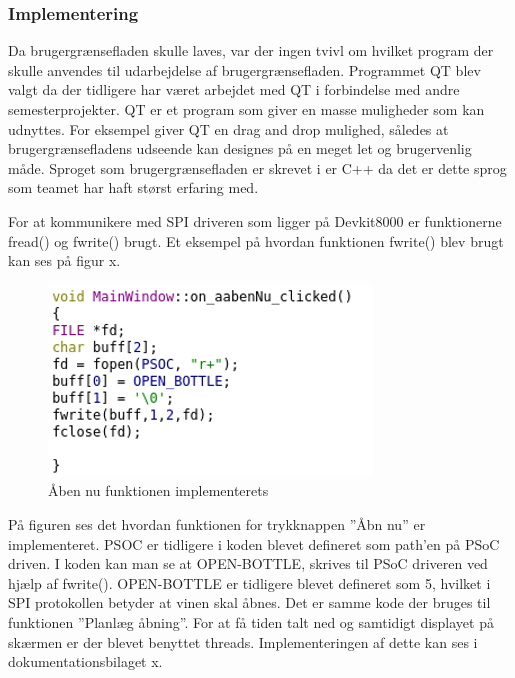 \subsubsection{Implementering}

Da brugergrænsefladen skulle laves, var der ingen tvivl om hvilket program der skulle anvendes til udarbejdelse af brugergrænsefladen. Programmet QT blev valgt da der tidligere har været arbejdet med QT i forbindelse med andre semesterprojekter. QT er et program som giver en masse muligheder som kan udnyttes. For eksempel giver QT en drag and drop mulighed, således at brugergrænsefladens udseende kan designes på en meget let og brugervenlig måde.
Sproget som brugergrænsefladen er skrevet i er C++ da det er dette sprog som teamet har haft størst erfaring med.

For at kommunikere med SPI driveren som ligger på Devkit8000 er funktionerne fread() og fwrite() brugt. Et eksempel på hvordan funktionen fwrite() blev brugt kan ses på figur x.

\begin{figure}[H]
\includegraphics[scale=1]{tex/TeImRe/GUI/GUI-implementering/Billeder/kodeeksempel.png}
\caption{Åben nu funktionen implementerets}
\end{figure}

På figuren ses det hvordan funktionen for trykknappen ”Åbn nu” er implementeret. PSOC er tidligere i koden blevet defineret som path’en på PSoC driven. I koden kan man se at OPEN-BOTTLE, skrives til PSoC driveren ved hjælp af fwrite(). OPEN-BOTTLE er tidligere blevet defineret som 5, hvilket i SPI protokollen betyder at vinen skal åbnes. Det er samme kode der bruges til funktionen ”Planlæg åbning”.
For at få tiden talt ned og samtidigt displayet på skærmen er der blevet benyttet threads. Implementeringen af dette kan ses i dokumentationsbilaget x.
